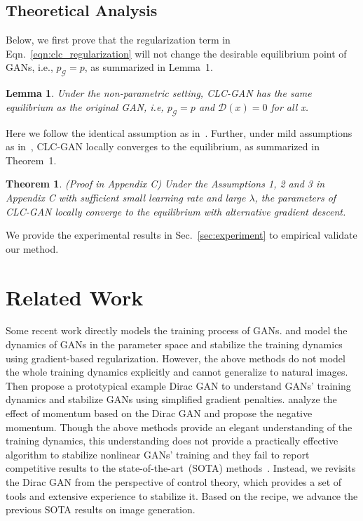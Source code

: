 \documentclass{article}
\newcommand{\xG}{\mathcal{G}}
\newcommand{\xD}{\mathcal{D}}
\newcommand{\eqn}[1]{Eqn.~\eqref{eqn:#1}}
\newcommand{\secref}[1]{Sec.~\ref{sec:#1}} \usepackage{wrapfig}
\newtheorem{lemma}{Lemma}
\newtheorem{theorem}{Theorem}
\theoremstyle{definition}
\begin{document}
\subsection{Theoretical Analysis}
Below, we first prove that the regularization term in \eqn{clc_regularization} will not change the desirable equilibrium point of GANs, i.e., $p_\xG=p$, as summarized in Lemma~1.

\begin{lemma}
Under the non-parametric setting, CLC-GAN has the same equilibrium as the original GAN, i.e, $p_\xG=p$ and $\xD(x)=0$ for all x.
\end{lemma}

Here we follow the identical assumption as in~\citet{goodfellow2014generative}.
Further, under mild assumptions as in~\citet{mescheder2018training}, CLC-GAN locally converges to the equilibrium, as summarized in Theorem~1.


\begin{theorem}(Proof in Appendix C)
Under the Assumptions 1, 2 and 3 in Appendix C with sufficient small learning rate and large $\lambda$, the parameters of CLC-GAN locally converge to the equilibrium with alternative gradient descent.
\end{theorem}

We provide the experimental results in \secref{experiment} to empirical validate our method.







\section{Related Work}\label{sec:related_work}




Some recent work directly models the training process of GANs.
\citet{mescheder2017numerics} and \citet{nagarajan2017gradient} model the dynamics of GANs in the parameter space and stabilize the training dynamics using gradient-based regularization. However, the above methods do not model the whole training dynamics explicitly and cannot generalize to natural images.
Then \citet{mescheder2018training} propose a prototypical example Dirac GAN to understand GANs' training dynamics and stabilize GANs using simplified gradient penalties. 
\citet{gidel2018negative} analyze the effect of momentum based on the Dirac GAN and propose the negative momentum.
Though the above methods provide an elegant understanding of the training dynamics, this understanding does not provide a practically effective algorithm to stabilize nonlinear GANs' training and they fail to report competitive results to the state-of-the-art~(SOTA) methods~\cite{miyato2018spectral}. 
Instead, we revisits the Dirac GAN from the perspective of control theory, which provides a set of tools and extensive experience to stabilize it.
Based on the recipe, we advance the previous SOTA results on image generation.
\end{document}
